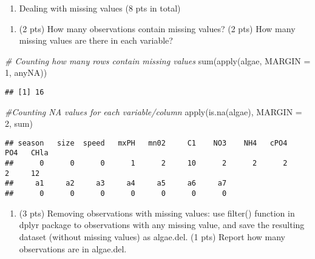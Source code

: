 \documentclass[
]{article}
\newenvironment{Shaded}{\begin{snugshade}}{\end{snugshade}}
\newcommand{\AttributeTok}[1]{\textcolor[rgb]{0.77,0.63,0.00}{#1}}
\newcommand{\CommentTok}[1]{\textcolor[rgb]{0.56,0.35,0.01}{\textit{#1}}}
\newcommand{\DecValTok}[1]{\textcolor[rgb]{0.00,0.00,0.81}{#1}}
\newcommand{\FunctionTok}[1]{\textcolor[rgb]{0.00,0.00,0.00}{#1}}
\newcommand{\NormalTok}[1]{#1}
\providecommand{\tightlist}{%
  \setlength{\itemsep}{0pt}\setlength{\parskip}{0pt}}
\begin{document}
\begin{enumerate}
\def\labelenumi{\arabic{enumi}.}
\setcounter{enumi}{2}
\tightlist
\item
  Dealing with missing values (8 pts in total)
\end{enumerate}

\begin{enumerate}
\def\labelenumi{\alph{enumi}.}
\tightlist
\item
  (2 pts) How many observations contain missing values? (2 pts) How many
  missing values are there in each variable?
\end{enumerate}

\begin{Shaded}
\begin{Highlighting}[]
\CommentTok{\# Counting how many rows contain missing values}
\FunctionTok{sum}\NormalTok{(}\FunctionTok{apply}\NormalTok{(algae, }\AttributeTok{MARGIN =} \DecValTok{1}\NormalTok{, anyNA))}
\end{Highlighting}
\end{Shaded}

\begin{verbatim}
## [1] 16
\end{verbatim}

\begin{Shaded}
\begin{Highlighting}[]
\CommentTok{\#Counting NA values for each variable/column}
\FunctionTok{apply}\NormalTok{(}\FunctionTok{is.na}\NormalTok{(algae), }\AttributeTok{MARGIN =} \DecValTok{2}\NormalTok{, sum)}
\end{Highlighting}
\end{Shaded}

\begin{verbatim}
## season   size  speed   mxPH   mn02     C1    NO3    NH4   cPO4    PO4   CHla 
##      0      0      0      1      2     10      2      2      2      2     12 
##     a1     a2     a3     a4     a5     a6     a7 
##      0      0      0      0      0      0      0
\end{verbatim}

\begin{enumerate}
\def\labelenumi{\alph{enumi}.}
\setcounter{enumi}{1}
\tightlist
\item
  (3 pts) Removing observations with missing values: use filter()
  function in dplyr package to observations with any missing value, and
  save the resulting dataset (without missing values) as algae.del. (1
  pts) Report how many observations are in algae.del.
\end{enumerate}
\end{document}
